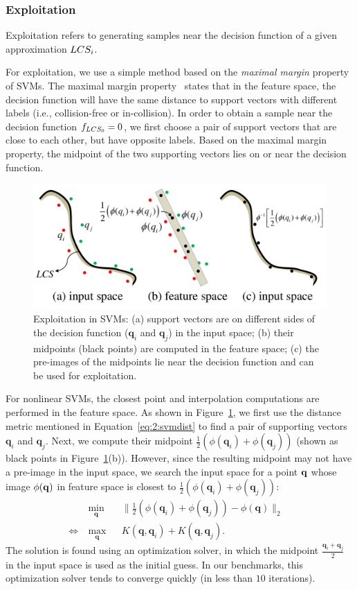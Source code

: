 \subsubsection{Exploitation}
Exploitation refers to generating samples near the decision
function of a given approximation $LCS_i$.

For exploitation, we use a simple method based on the \emph{maximal margin} property
of SVMs. The maximal margin
property~\cite{Vapnik:1995:NSL} states that in the feature space, the decision function
will have the same distance to support vectors with different
labels (i.e., collision-free or in-collision). In order to obtain a sample near the
decision function $f_{LCS_0} = 0$, we first choose a pair of support
vectors that are close to each other, but have opposite labels.
Based on the maximal margin property, the midpoint of the two
supporting vectors lies on or near the decision function.
\begin{figure}[htb]
  \centering
  \includegraphics[width=0.6\linewidth]{figs/2/interpolation.pdf}
  \caption[Exploitation in SVMs]{Exploitation in SVMs:
  (a) support vectors are on different sides of the decision function ($\mathbf q_i$ and $\mathbf q_j$) in the input space;
  (b) their midpoints (black points) are computed in the feature space;
  (c) the pre-images of the midpoints lie near the decision function and can be used for exploitation.}
  \label{fig:2:interpolation}
\end{figure}
For nonlinear SVMs, the closest point and interpolation computations are
performed in the feature space. As shown in
Figure~\ref{fig:2:interpolation}, we first use the distance metric
mentioned in Equation~\ref{eq:2:svmdist} to find a pair of
supporting vectors $\mathbf q_i$ and $\mathbf q_j$. Next, we
compute their midpoint $\frac{1}{2}(\phi(\mathbf q_i) +
\phi(\mathbf q_j))$ (shown as black points in Figure~\ref{fig:2:interpolation}(b)). However, since the resulting midpoint may not have a pre-image in the input space, we search the input
space for a point $\mathbf q$ whose image $\phi(\mathbf q)$ in
feature space is closest to $\frac{1}{2}(\phi(\mathbf q_i) +
\phi(\mathbf q_j))$:
\begin{equation}
\begin{aligned}
\label{eq:2:preimage}
& \ \underset{\mathbf q}{\text{min}} & & \|\frac{1}{2}(\phi(\mathbf q_i) + \phi(\mathbf q_j)) - \phi(\mathbf q)\|_2 & \\
\Leftrightarrow & \ \underset{\mathbf q}{\text{max}} & & K(\mathbf q, \mathbf q_i) + K(\mathbf q, \mathbf q_j). &
\end{aligned}
\end{equation}
The solution is found using an optimization solver, in which the midpoint $\frac{\mathbf q_i +
\mathbf q_j}{2}$ in the input space is used as the initial guess. In our
benchmarks, this optimization solver tends to converge quickly
(in less than $10$ iterations).


